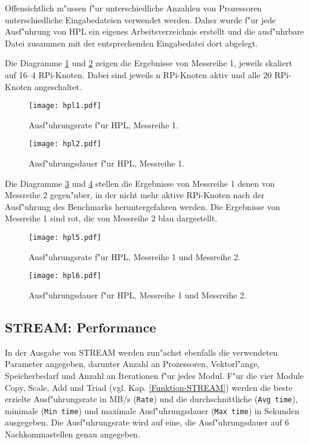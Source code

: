 Offensichtlich m"ussen f"ur unterschiedliche Anzahlen von Prozessoren unterschiedliche Eingabedateien verwendet werden. Daher wurde f"ur jede Ausf"uhrung von HPL ein eigenes Arbeitsverzeichnis erstellt und die ausf"uhrbare Datei zusammen mit der entsprechenden Eingabedatei dort abgelegt. 

Die Diagramme \ref{fig:hpl1} und \ref{fig:hpl2} zeigen die Ergebnisse von Messreihe 1, jeweils skaliert auf 16--4 RPi-Knoten. Dabei sind jeweils n RPi-Knoten aktiv und alle 20 RPi-Knoten angeschaltet.
\begin{figure}[htb]
  \centering
  \texttt{[image: hpl1.pdf]}\\ 
  \caption{Ausf"uhrungsrate f"ur HPL, Messreihe 1.}
  \label{fig:hpl1}		
\end{figure}
\begin{figure}[htb]
  \centering
  \texttt{[image: hpl2.pdf]}\\ 
  \caption{Ausf"uhrungsdauer f"ur HPL, Messreihe 1.}
  \label{fig:hpl2}		
\end{figure}
\noindent
Die Diagramme \ref{fig:hpl5} und \ref{fig:hpl6} stellen die Ergebnisse von Messreihe 1 denen von Messreihe 2 gegen"uber, in der nicht mehr aktive RPi-Knoten nach der Ausf"uhrung des Benchmarks heruntergefahren werden. Die Ergebnisse von Messreihe 1 sind rot, die von Messreihe 2 blau dargestellt.
\begin{figure}[htb]
  \centering
  \texttt{[image: hpl5.pdf]}\\ 
  \caption{Ausf"uhrungsrate f"ur HPL, Messreihe 1 und Messreihe 2.}\label{fig:hpl5}
\end{figure}
\begin{figure}[htb]
  \centering
  \texttt{[image: hpl6.pdf]}\\ 
  \caption{Ausf"uhrungsdauer f"ur HPL, Messreihe 1 und Messreihe 2.}\label{fig:hpl6}
\end{figure}

\subsection{STREAM: Performance}\label{Ergebnisse-STREAM}

In der Ausgabe von STREAM werden zun"achst ebenfalls die verwendeten Parameter angegeben, darunter Anzahl an Prozessoren, Vektorl"ange, Speicherbedarf und Anzahl an Iterationen f"ur jedes Modul. F"ur die vier Module Copy, Scale, Add und Triad (vgl. Kap. \ref{Funktion-STREAM}) werden die beste erzielte Ausf"uhrungsrate in MB/s (\texttt{Rate}) und die durchschnittliche (\texttt{Avg time}), minimale (\texttt{Min time}) und maximale Ausf"uhrungsdauer (\texttt{Max time}) in Sekunden ausgegeben. Die Ausf"uhrungsrate wird auf eine, die Ausf"uhrungsdauer auf 6 Nachkommastellen genau angegeben. 


